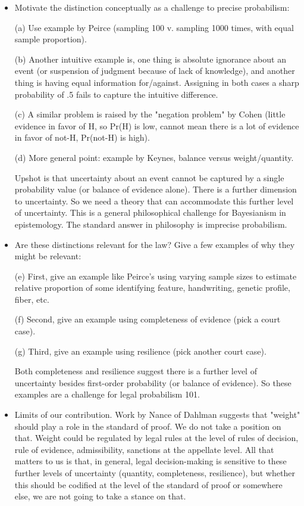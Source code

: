 \documentclass[
  10pt,
  dvipsnames,enabledeprecatedfontcommands]{scrartcl}
\begin{document}
\begin{itemize}

\item Motivate the distinction conceptually as a challenge to precise probabilism:

(a) Use example by Peirce (sampling 100 v. sampling 1000 times, with equal sample proportion). 

(b) Another intuitive example is, one thing is absolute ignorance about an event (or suspension of judgment because of lack of knowledge), and another thing is having equal information for/against. Assigning in both cases a sharp probability of .5 fails to capture the intuitive difference. 

(c) A similar problem is raised by the "negation problem" by Cohen (little evidence in favor of H, so Pr(H) is low, cannot mean there is a lot of evidence in favor of not-H, Pr(not-H) is high). 

(d) More general point: example by Keynes, balance versus weight/quantity. 

Upshot  is that uncertainty about an event cannot be captured by a single probability value (or balance of evidence alone). There is a further dimension to uncertainty. So we need a theory that can accommodate this further level of uncertainty. This is a general philosophical challenge for Bayesianism in epistemology. The standard answer in philosophy is imprecise probabilism. 

\item Are these distinctions relevant for the law? Give a few examples of why they might be relevant:

(e) First, give an example like Peirce's using varying sample sizes to estimate relative proportion of some identifying feature, handwriting, genetic profile, fiber, etc. 

(f) Second, give an example using completeness of evidence (pick a court case). 

(g) Third, give an example using resilience (pick another court case). 

Both completeness and resilience suggest there is a further level of uncertainty besides first-order probability (or balance of evidence). So these examples are a challenge for legal probabilism 101.

\item Limits of our contribution. Work by Nance of Dahlman suggests that "weight" should play a role in the standard of proof. We do not take a position on that. Weight could be regulated by legal rules at the level of rules of decision, rule of evidence,  admissibility, sanctions at the appellate level. All that matters to us is that, in general, legal decision-making is sensitive to these further levels of uncertainty (quantity, completeness, resilience), but whether this should be codified at the level of the standard of proof or somewhere else, we are not going to take a stance on that.


\end{itemize}
\end{document}
